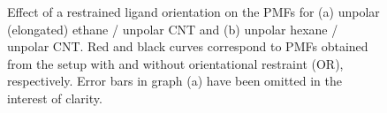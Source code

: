 \documentclass[9pt,lessons]{livecoms}
\begin{document}
\begin{figure}[htb!]
  \centering    
  \caption{Effect of a restrained ligand orientation on the PMFs for (a) unpolar (elongated) ethane / unpolar CNT 
  and (b) unpolar hexane / unpolar CNT.
  Red and black curves correspond to PMFs obtained from the setup with and without orientational restraint (OR), respectively.
  Error bars in graph (a) have been omitted in the interest of clarity.
  }
  \label{fig:OriRest}
\end{figure}
\end{document}
